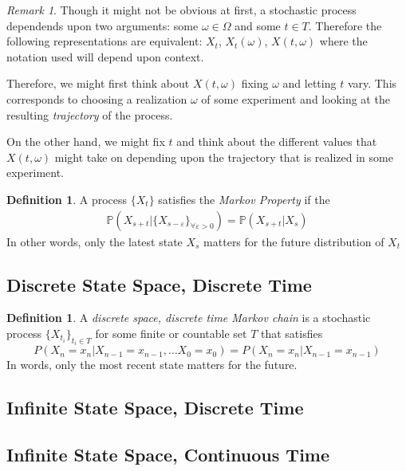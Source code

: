 \documentclass[12pt]{article}
\theoremstyle{plain}
\theoremstyle{definition}
\newtheorem{defn}[thm]{Definition}
\theoremstyle{remark}
\newtheorem*{rmk}{Remark}
\begin{document}
\begin{rmk}
Though it might not be obvious at first, a stochastic process dependends
upon two arguments: some $\omega\in\Omega$ and some $t\in T$. Therefore
the following representations are equivalent: $X_t$, $X_t(\omega)$,
$X(t,\omega)$ where the notation used will depend upon context.

Therefore, we might first think about $X(t,\omega)$ fixing $\omega$ and
letting $t$ vary. This corresponds to choosing a realization $\omega$ of
some experiment and looking at the resulting \emph{trajectory} of the
process.

On the other hand, we might fix $t$ and think about the different values
that $X(t,\omega)$ might take on depending upon the trajectory that is
realized in some experiment.
\end{rmk}

\begin{defn}
A process $\{X_t\}$ satisfies the \emph{Markov Property} if the
\begin{align*}
\mathbb{P}\left(X_{s+t} | \{X_{s-\varepsilon}\}_{\forall\varepsilon>0}\right)
= \mathbb{P}\left(X_{s+t} | X_{s}\right)
\end{align*}
In other words, only the latest state $X_s$ matters for the future distribution of $X_t$

\end{defn}

\subsection{Discrete State Space, Discrete Time}

\begin{defn}
A \emph{discrete space, discrete time Markov chain} is a stochastic
process $\{X_{t_i}\}_{t_i\in T}$ for some finite or countable set $T$
that satisfies
\begin{equation}
  P(X_n = x_n | X_{n-1} = x_{n-1}, \ldots
  X_0 = x_0) = P(X_n = x_n | X_{n-1}=x_{n-1})
\end{equation}
In words, only the most recent state matters for the future.
\end{defn}

\subsection{Infinite State Space, Discrete Time}
\subsection{Infinite State Space, Continuous Time}
\end{document}
